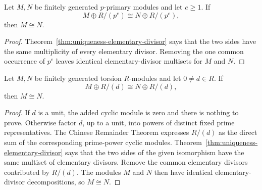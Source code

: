 \begin{corollary}
Let \(M,N\) be finitely generated \(p\)-primary modules and let \(e\geq1\).
If
\[
M\oplus R/(p^e)\cong N\oplus R/(p^e),
\]
then \(M\cong N\).
\end{corollary}
\begin{proof}
Theorem~\ref{thm:uniqueness-elementary-divisor} says that the two sides have
the same multiplicity of every elementary divisor. Removing the one common
occurrence of \(p^e\) leaves identical elementary-divisor multisets for \(M\)
and \(N\).
\end{proof}

\begin{corollary}\label{cor:cyclic-cancellation}
Let \(M,N\) be finitely generated torsion \(R\)-modules and let \(0\ne d\in R\).
If
\[
M\oplus R/(d)\cong N\oplus R/(d),
\]
then \(M\cong N\).
\end{corollary}
\begin{proof}
If \(d\) is a unit, the added cyclic module is zero and there is nothing to
prove. Otherwise factor \(d\), up to a unit, into powers of distinct fixed
prime representatives. The Chinese Remainder Theorem expresses \(R/(d)\) as
the direct sum of the corresponding prime-power cyclic modules.
Theorem~\ref{thm:uniqueness-elementary-divisor} says that the two sides of the
given isomorphism have the same multiset of elementary divisors. Remove the
common elementary divisors contributed by \(R/(d)\). The modules \(M\) and
\(N\) then have identical elementary-divisor decompositions, so \(M\cong N\).
\end{proof}


